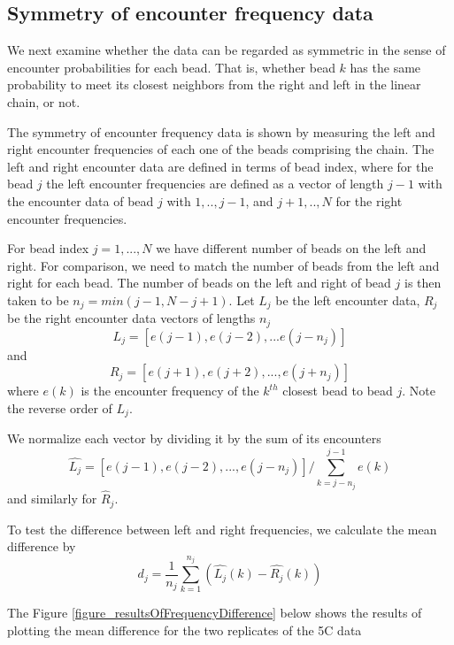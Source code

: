 \documentclass[12pt]{book}
\begin{document}
\subsection{Symmetry of encounter frequency data}
We next examine whether the data can be regarded as symmetric in the sense of encounter probabilities for each bead. That is, whether bead $k$ has the same probability to meet its closest neighbors from the right and left in the linear chain, or not.  

The symmetry of encounter frequency data is shown by measuring the left and right encounter frequencies of each one of the beads comprising the chain.
The left and right encounter data are defined in terms of bead index, where for the bead $j$ the left encounter frequencies are defined as a vector of length $j-1$ with the encounter data of bead $j$ with $1,..,j-1$, and $j+1,..,N$ for the right encounter frequencies. 

For bead index $j=1,...,N$ we have different number of beads on the left and right. For comparison, we need to match the number of beads from the left and right for each bead. The number of beads on the left and right of bead $j$ is then taken to be $n_j=min(j-1,N-j+1)$. 
Let $L_j$ be the left encounter data, $R_j$ be the right encounter data vectors of lengths $n_j$
\begin{equation*}
L_j=\left[e(j-1),e(j-2),...e(j-n_j)\right] 
\end{equation*}
and 
\begin{equation*}
R_j=\left[e(j+1), e(j+2),...,e(j+n_j)\right]
\end{equation*}
where $e(k)$ is the encounter frequency of the $k^{th}$ closest bead to bead $j$. Note the reverse order of $L_j$.

We normalize each vector by dividing it by the sum of its encounters
\begin{equation*}
\hat{L_j} =\left[e(j-1),e(j-2),...,e(j-n_j)\right]/\sum_{k=j-n_j}^{j-1}e(k)
\end{equation*}
and similarly for $\hat{R}_j$.

To test the difference between left and right frequencies, we calculate the mean difference by 
\begin{equation*}
d_j=\frac{1}{n_j}\sum_{k=1}^{n_j} \left(\hat{L_j}(k)-\hat{R_j}(k)\right)
\end{equation*}

The Figure \ref{figure_resultsOfFrequencyDifference} below shows the results of plotting the mean difference for the two replicates of the 5C data 
\end{document}
